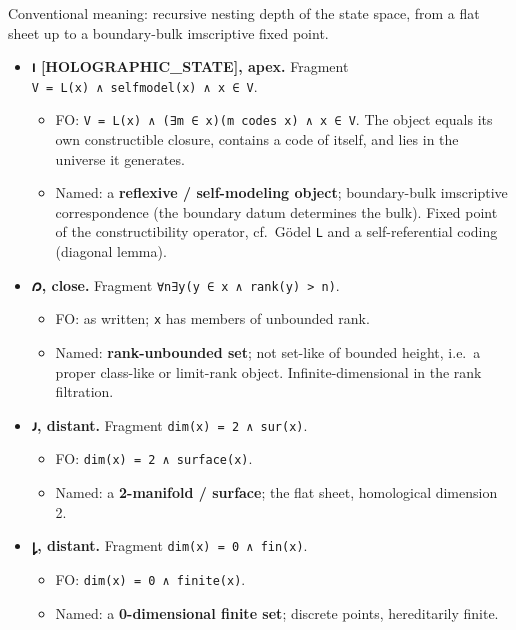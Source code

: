 Conventional meaning: recursive nesting depth of the state space, from a
flat sheet up to a boundary-bulk imscriptive fixed point.

\begin{itemize}
\tightlist
\item
  \textbf{𐑦 {[}HOLOGRAPHIC\_STATE{]}, apex.} Fragment
  \texttt{V\ =\ L(x)\ ∧\ selfmodel(x)\ ∧\ x\ ∈\ V}.

  \begin{itemize}
  \tightlist
  \item
    FO: \texttt{V\ =\ L(x)\ ∧\ (∃m\ ∈\ x)(m\ codes\ x)\ ∧\ x\ ∈\ V}. The
    object equals its own constructible closure, contains a code of
    itself, and lies in the universe it generates.
  \item
    Named: a \textbf{reflexive / self-modeling object}; boundary-bulk
    imscriptive correspondence (the boundary datum determines the bulk).
    Fixed point of the constructibility operator, cf.~Gödel \texttt{L}
    and a self-referential coding (diagonal lemma).
  \end{itemize}
\item
  \textbf{𐑼, close.} Fragment
  \texttt{∀n∃y(y\ ∈\ x\ ∧\ rank(y)\ \textgreater{}\ n)}.

  \begin{itemize}
  \tightlist
  \item
    FO: as written; \texttt{x} has members of unbounded rank.
  \item
    Named: \textbf{rank-unbounded set}; not set-like of bounded height,
    i.e.~a proper class-like or limit-rank object. Infinite-dimensional
    in the rank filtration.
  \end{itemize}
\item
  \textbf{𐑨, distant.} Fragment \texttt{dim(x)\ =\ 2\ ∧\ sur(x)}.

  \begin{itemize}
  \tightlist
  \item
    FO: \texttt{dim(x)\ =\ 2\ ∧\ surface(x)}.
  \item
    Named: a \textbf{2-manifold / surface}; the flat sheet, homological
    dimension 2.
  \end{itemize}
\item
  \textbf{𐑛, distant.} Fragment \texttt{dim(x)\ =\ 0\ ∧\ fin(x)}.

  \begin{itemize}
  \tightlist
  \item
    FO: \texttt{dim(x)\ =\ 0\ ∧\ finite(x)}.
  \item
    Named: a \textbf{0-dimensional finite set}; discrete points,
    hereditarily finite.
  \end{itemize}
\end{itemize}

